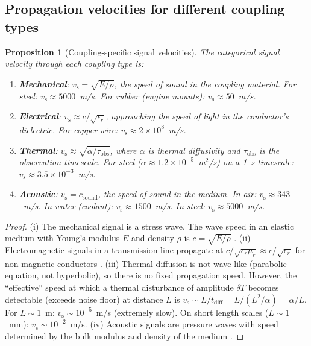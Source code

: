 \documentclass[twocolumn,10pt,a4paper]{article}
\newtheorem{proposition}[theorem]{Proposition}
\theoremstyle{definition}
\theoremstyle{remark}
\newcommand{\vs}{v_{\mathrm{s}}}
\begin{document}
\subsection{Propagation velocities for different coupling types}

\begin{proposition}[Coupling-specific signal velocities]\label{prop:signal_velocities}
The categorical signal velocity through each coupling type is:
\begin{enumerate}[label=(\roman*)]
\item \textbf{Mechanical}: $\vs = \sqrt{E/\rho}$, the speed of sound in the coupling material. For steel: $\vs \approx 5000$~m/s. For rubber (engine mounts): $\vs \approx 50$~m/s.
\item \textbf{Electrical}: $\vs \approx c/\sqrt{\epsilon_r}$, approaching the speed of light in the conductor's dielectric. For copper wire: $\vs \approx 2 \times 10^8$~m/s.
\item \textbf{Thermal}: $\vs \approx \sqrt{\alpha / \tau_{\mathrm{obs}}}$, where $\alpha$ is thermal diffusivity and $\tau_{\mathrm{obs}}$ is the observation timescale. For steel ($\alpha \approx 1.2 \times 10^{-5}$~m$^2$/s) on a 1~s timescale: $\vs \approx 3.5 \times 10^{-3}$~m/s.
\item \textbf{Acoustic}: $\vs = c_{\mathrm{sound}}$, the speed of sound in the medium. In air: $\vs \approx 343$~m/s. In water (coolant): $\vs \approx 1500$~m/s. In steel: $\vs \approx 5000$~m/s.
\end{enumerate}
\end{proposition}

\begin{proof}
(i) The mechanical signal is a stress wave. The wave speed in an elastic medium with Young's modulus $E$ and density $\rho$ is $c = \sqrt{E/\rho}$ \citep{Graff1975}. (ii) Electromagnetic signals in a transmission line propagate at $c/\sqrt{\epsilon_r \mu_r} \approx c/\sqrt{\epsilon_r}$ for non-magnetic conductors \citep{DesoerKuh1969}. (iii) Thermal diffusion is not wave-like (parabolic equation, not hyperbolic), so there is no fixed propagation speed. However, the ``effective'' speed at which a thermal disturbance of amplitude $\delta T$ becomes detectable (exceeds noise floor) at distance $L$ is $\vs \sim L/t_{\mathrm{diff}} = L/(L^2/\alpha) = \alpha/L$. For $L \sim 1$~m: $\vs \sim 10^{-5}$~m/s (extremely slow). On short length scales ($L \sim 1$~mm): $\vs \sim 10^{-2}$~m/s. (iv) Acoustic signals are pressure waves with speed determined by the bulk modulus and density of the medium \citep{Kinsler2000}.
\end{proof}
\end{document}
